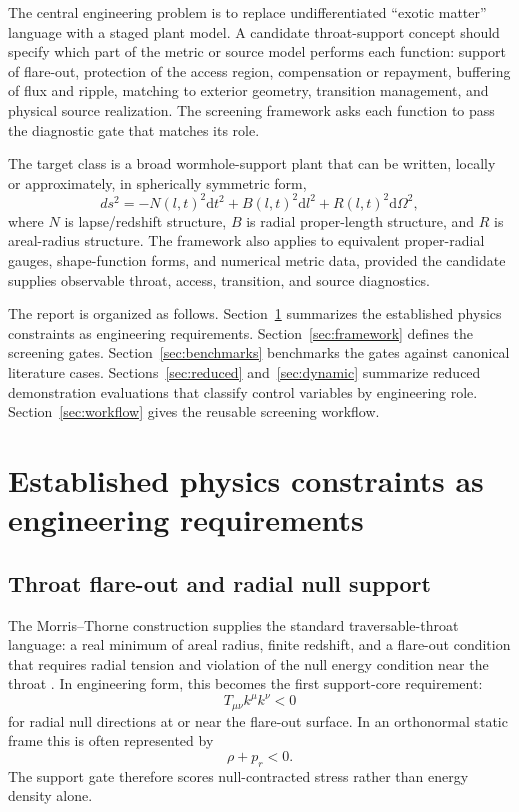 \documentclass[11pt]{article}
\newcommand{\dd}{\mathrm{d}}
\newcommand{\Tkk}{T_{\mu\nu}k^\mu k^\nu}
\begin{document}
The central engineering problem is to replace undifferentiated ``exotic matter'' language with a staged plant model.  A candidate throat-support concept should specify which part of the metric or source model performs each function: support of flare-out, protection of the access region, compensation or repayment, buffering of flux and ripple, matching to exterior geometry, transition management, and physical source realization.  The screening framework asks each function to pass the diagnostic gate that matches its role.

The target class is a broad wormhole-support plant that can be written, locally or approximately, in spherically symmetric form,
\begin{equation}
 ds^2=-N(l,t)^2\dd t^2+B(l,t)^2\dd l^2+R(l,t)^2\dd\Omega^2,
 \label{eq:general_metric}
\end{equation}
where $N$ is lapse/redshift structure, $B$ is radial proper-length structure, and $R$ is areal-radius structure.  The framework also applies to equivalent proper-radial gauges, shape-function forms, and numerical metric data, provided the candidate supplies observable throat, access, transition, and source diagnostics.

The report is organized as follows.  Section~\ref{sec:literature} summarizes the established physics constraints as engineering requirements.  Section~\ref{sec:framework} defines the screening gates.  Section~\ref{sec:benchmarks} benchmarks the gates against canonical literature cases.  Sections~\ref{sec:reduced} and~\ref{sec:dynamic} summarize reduced demonstration evaluations that classify control variables by engineering role.  Section~\ref{sec:workflow} gives the reusable screening workflow.

\section{Established physics constraints as engineering requirements}
\label{sec:literature}

\subsection{Throat flare-out and radial null support}

The Morris--Thorne construction supplies the standard traversable-throat language: a real minimum of areal radius, finite redshift, and a flare-out condition that requires radial tension and violation of the null energy condition near the throat \citep{morris_thorne_1988}.  In engineering form, this becomes the first support-core requirement:
\begin{equation}
 \Tkk < 0
\end{equation}
for radial null directions at or near the flare-out surface.  In an orthonormal static frame this is often represented by
\begin{equation}
 \rho+p_r<0.
\end{equation}
The support gate therefore scores null-contracted stress rather than energy density alone.
\end{document}
